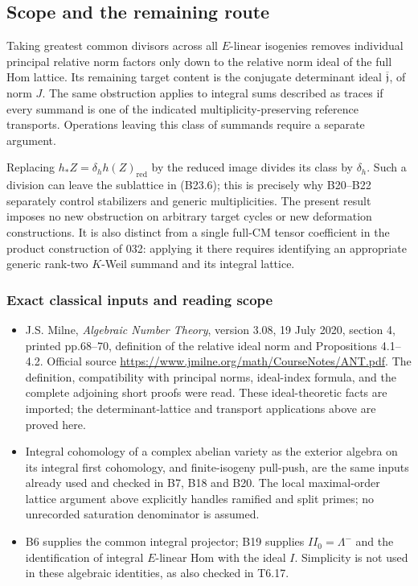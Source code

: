\documentclass[11pt,a4paper]{article}
\providecommand{\tightlist}{\setlength{\itemsep}{0pt}\setlength{\parskip}{0pt}}
\theoremstyle{definition}
\begin{document}
\subsection{Scope and the remaining route}\label{scope-and-the-remaining-route}

Taking greatest common divisors across all \(E\)-linear isogenies removes individual principal relative norm factors only down to the relative norm ideal of the full Hom lattice. Its remaining target content is the conjugate determinant ideal \(\overline{\mathfrak j}\), of norm \(J\). The same obstruction applies to integral sums described as traces if every summand is one of the indicated multiplicity-preserving reference transports. Operations leaving this class of summands require a separate argument.

Replacing \(h_*Z=\delta_h h(Z)_{\mathrm{red}}\) by the reduced image divides its class by \(\delta_h\). Such a division can leave the sublattice in (B23.6); this is precisely why B20--B22 separately control stabilizers and generic multiplicities. The present result imposes no new obstruction on arbitrary target cycles or new deformation constructions. It is also distinct from a single full-CM tensor coefficient in the product construction of 032: applying it there requires identifying an appropriate generic rank-two \(K\)-Weil summand and its integral lattice.

\subsubsection{Exact classical inputs and reading scope}\label{exact-classical-inputs-and-reading-scope}

\begin{itemize}
\tightlist
\item
  J.S. Milne, \emph{Algebraic Number Theory}, version 3.08, 19 July 2020, section 4, printed pp.68--70, definition of the relative ideal norm and Propositions 4.1--4.2. Official source \url{https://www.jmilne.org/math/CourseNotes/ANT.pdf}. The definition, compatibility with principal norms, ideal-index formula, and the complete adjoining short proofs were read. These ideal-theoretic facts are imported; the determinant-lattice and transport applications above are proved here.
\item
  Integral cohomology of a complex abelian variety as the exterior algebra on its integral first cohomology, and finite-isogeny pull-push, are the same inputs already used and checked in B7, B18 and B20. The local maximal-order lattice argument above explicitly handles ramified and split primes; no unrecorded saturation denominator is assumed.
\item
  B6 supplies the common integral projector; B19 supplies \(II_0=\Lambda^-\) and the identification of integral \(E\)-linear Hom with the ideal \(I\). Simplicity is not used in these algebraic identities, as also checked in T6.17.
\end{itemize}
\end{document}
